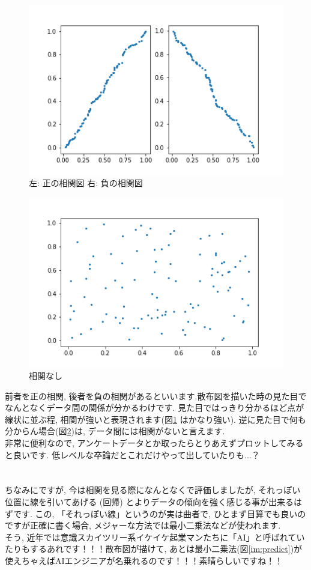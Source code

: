 \documentclass[11pt,a4paper]{jreport}
\begin{document}
\begin{figure}[H]
\label{im:scatter1}
  \centering
  \includegraphics[width=120mm,bb=0 0 432 288]{figures/scatter1.png}
  \caption{左: 正の相関図 右: 負の相関図}
\end{figure}

\begin{figure}[H]
\label{im:scatter2}
  \centering
  \includegraphics[width=120mm,bb=0 0 432 288]{figures/scatter2.png}
  \caption{相関なし}
\end{figure}

前者を正の相関, 後者を負の相関があるといいます.散布図を描いた時の見た目でなんとなくデータ間の関係が分かるわけです. 見た目ではっきり分かるほど点が線状に並ぶ程, 相関が強いと表現されます(図\ref{im:scatter1} はかなり強い). 逆に見た目で何も分からん場合(図\ref{im:scatter2})は, データ間には相関がないと言えます. \\
非常に便利なので, アンケートデータとか取ったらとりあえずプロットしてみると良いです. 低レベルな卒論だとこれだけやって出していたりも...？\\
\\
\\
ちなみにですが, 今は相関を見る際になんとなくで評価しましたが, それっぽい位置に線を引いてあげる (回帰) とよりデータの傾向を強く感じる事が出来るはずです. この, 「それっぽい線」というのが実は曲者で, ひとまず目算でも良いのですが正確に書く場合, メジャーな方法では最小二乗法などが使われます. \\
そう, 近年では意識スカイツリー系イケイケ起業マンたちに「AI」と呼ばれていたりもするあれです！！！散布図が描けて, あとは最小二乗法(図\ref{im:predict})が使えちゃえばAIエンジニアが名乗れるのです！！！素晴らしいですね！！\\
\end{document}
